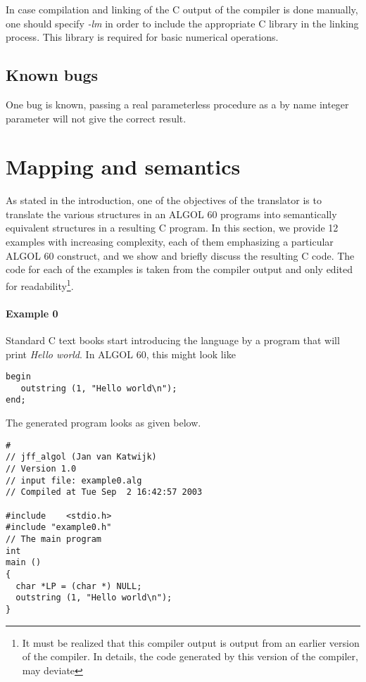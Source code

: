 \documentclass[11pt]{article}
\begin{document}
In case compilation and linking of the C output of the compiler
is done manually,
one should specify {\em -lm} in order to include the 
appropriate C library in the linking process. This library is required for basic numerical operations.
\subsection{Known bugs}
One bug is known, passing a real parameterless procedure as a by name
integer parameter will not give the correct result.
\section{Mapping and semantics}
As stated in the introduction, one of the objectives of the translator is to 
translate the various structures in an ALGOL 60 programs into semantically
equivalent structures in a resulting C program.
In this section, we provide 12 examples with increasing complexity,
each of them emphasizing a 
particular ALGOL 60 construct, and we show and briefly discuss
the resulting C code. The code for each of the examples is taken from
the compiler output and only edited for readability\footnote{It must be realized
that this compiler output is output from an earlier version of the compiler.
In details, the code generated by this version of the compiler, may deviate}.
\paragraph{Example 0}
Standard C text books start introducing the language by a program that will
print {\em Hello world}. In ALGOL 60, this might look like
{\footnotesize
\begin{verbatim}
begin
   outstring (1, "Hello world\n");
end;
\end{verbatim}
}
The generated program looks as given below.
{\footnotesize
\begin{verbatim}
#
// jff_algol (Jan van Katwijk)
// Version 1.0
// input file: example0.alg
// Compiled at Tue Sep  2 16:42:57 2003

#include	<stdio.h>
#include "example0.h"
// The main program
int
main ()
{
  char *LP = (char *) NULL;
  outstring (1, "Hello world\n");
}
\end{verbatim}
}
\end{document}
